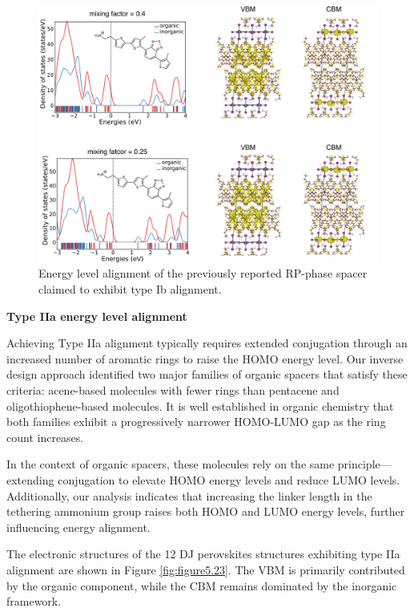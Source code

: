 \begin{figure}[htbp]
    \centering
    \includegraphics[width=\textwidth]{figures/synthesis-feasibility/figure5-22.png}
    \caption{Energy level alignment of the previously reported RP-phase spacer claimed to exhibit type Ib alignment. }
    \label{fig:figure5.22}
\end{figure}

\textbf{Type IIa energy level alignment}

Achieving Type IIa alignment typically requires extended conjugation through an increased number of aromatic rings to raise the HOMO energy level. Our inverse design approach identified two major families of organic spacers that satisfy these criteria: acene-based molecules with fewer rings than pentacene and oligothiophene-based molecules. It is well established in organic chemistry that both families exhibit a progressively narrower HOMO-LUMO gap as the ring count increases.

In the context of organic spacers, these molecules rely on the same principle—extending conjugation to elevate HOMO energy levels and reduce LUMO levels. Additionally, our analysis indicates that increasing the linker length in the tethering ammonium group raises both HOMO and LUMO energy levels, further influencing energy alignment.

The electronic structures of the 12 DJ perovskites structures exhibiting type IIa alignment are shown in Figure \ref{fig:figure5.23}. The VBM is primarily contributed by the organic component, while the CBM remains dominated by the inorganic framework.

